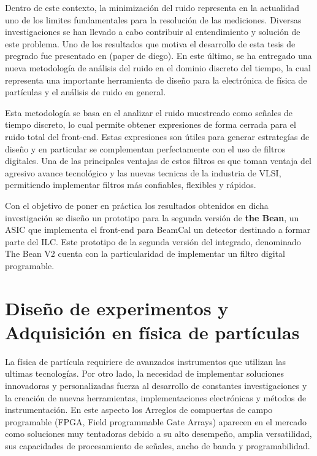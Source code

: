 Dentro de este contexto, la minimización del ruido representa en la actualidad uno de los limites fundamentales para la resolución de las mediciones. Diversas investigaciones se han llevado a cabo contribuir al entendimiento y solución de este problema. Uno de los resultados que motiva el desarrollo de esta tesis de pregrado fue presentado en (paper de diego). En este último, se ha entregado una nueva metodología de análisis del ruido en el dominio discreto del tiempo, la cual representa una importante herramienta de diseño para la electrónica de física de partículas y el análisis de ruido en general. 

Esta metodología se basa en el analizar el ruido muestreado como señales de tiempo discreto, lo cual permite obtener expresiones de forma cerrada para el ruido total del front-end. Estas expresiones son útiles para generar estrategías de diseño y en particular se complementan perfectamente con el uso de filtros digitales. Una de las principales ventajas de estos filtros es que toman ventaja del agresivo avance tecnológico y las nuevas tecnicas de la industria de VLSI, permitiendo implementar filtros más confiables, flexibles y rápidos.

Con el objetivo de poner en práctica los resultados obtenidos en dicha investigación se diseño un prototipo para la segunda versión de \textbf{the Bean}, un ASIC que implementa el front-end para BeamCal un detector destinado a formar parte del ILC. Este prototipo de la segunda versión del integrado, denominado The Bean V2 cuenta con la particularidad de implementar un filtro digital programable.


 


\section{Diseño de experimentos y Adquisición en física de partículas}

La física de partícula requiriere de avanzados instrumentos que utilizan las ultimas tecnologías. Por otro lado, la necesidad de implementar soluciones innovadoras y personalizadas fuerza al desarrollo de constantes investigaciones y la creación de nuevas herramientas, implementaciones electrónicas y métodos de instrumentación.
En este aspecto los Arreglos de compuertas de campo programable (FPGA, Field programmable Gate Arrays) aparecen en el mercado como soluciones muy tentadoras debido a su alto desempeño, amplia versatilidad, sus capacidades de procesamiento de señales, ancho de banda y programabilidad. 

